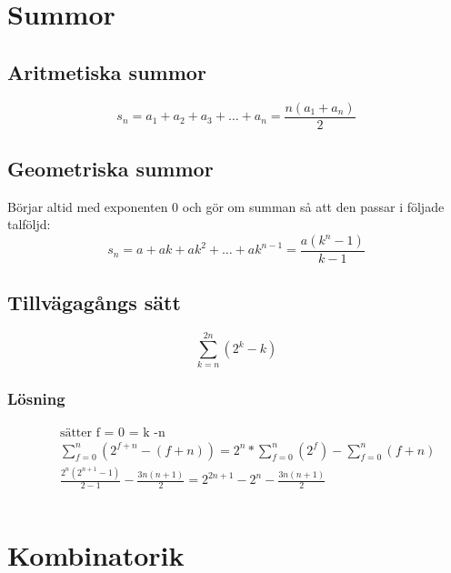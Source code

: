 \begin{multicols}{2}
\newpage

\section{Summor}
\subsection{Aritmetiska summor}
\begin{equation}
s _ { n } = a _ { 1 } + a _ { 2 } + a _ { 3 } + \ldots + a _ { n } = \frac { n \left( a _ { 1 } + a _ { n } \right) } { 2 }
\end{equation}


\subsection{Geometriska summor}
Börjar altid med exponenten 0 och gör om summan så att den passar i följade talföljd:
\begin{equation}
s _ { n } = a + a k + a k ^ { 2 } + \ldots + a k ^ { n - 1 } = \frac { a \left( k ^ { n } - 1 \right) } { k - 1 }
\end{equation}


\subsection{Tillvägagångs sätt}
\begin{equation}
\displaystyle\sum _ { k = n } ^ { 2n } (2^{k} - k)
\end{equation}
\subsubsection{Lösning}
\begin{align*}
  &\quad \text{sätter f = 0 = k -n} \\
  &\quad \displaystyle\sum _ { f = 0 } ^ { n } (2^{f+n} - (f+n)) = 2^{n} * \displaystyle\sum _ { f = 0 } ^ { n } (2^{f}) - \displaystyle\sum _ { f = 0 } ^ { n } (f+n) \\
  &\quad \frac{2^{n} (2^{n+1} -1)}{2-1} - \frac{3n(n+1)}{2} = 2^{2n+1} - 2^{n} - \frac{3n(n+1)}{2}\\
  &\quad  \\
\end{align*}


\newpage

\section{Kombinatorik}

\end{multicols}
